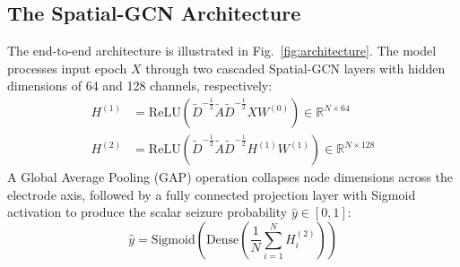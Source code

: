 \documentclass[journal]{IEEEtran}
\begin{document}
\subsection{The Spatial-GCN Architecture}
The end-to-end architecture is illustrated in Fig.~\ref{fig:architecture}. The model processes input epoch $X$ through two cascaded Spatial-GCN layers with hidden dimensions of 64 and 128 channels, respectively:
\begin{align}
H^{(1)} &= \text{ReLU}\left(\tilde{D}^{-\frac{1}{2}} \tilde{A} \tilde{D}^{-\frac{1}{2}} X W^{(0)}\right) \in \mathbb{R}^{N \times 64} \\
H^{(2)} &= \text{ReLU}\left(\tilde{D}^{-\frac{1}{2}} \tilde{A} \tilde{D}^{-\frac{1}{2}} H^{(1)} W^{(1)}\right) \in \mathbb{R}^{N \times 128}
\end{align}
A Global Average Pooling (GAP) operation collapses node dimensions across the electrode axis, followed by a fully connected projection layer with Sigmoid activation to produce the scalar seizure probability $\hat{y} \in [0, 1]$:
\begin{equation}
\hat{y} = \text{Sigmoid}\left(\text{Dense}\left(\frac{1}{N}\sum_{i=1}^N H_i^{(2)}\right)\right)
\end{equation}
\end{document}
